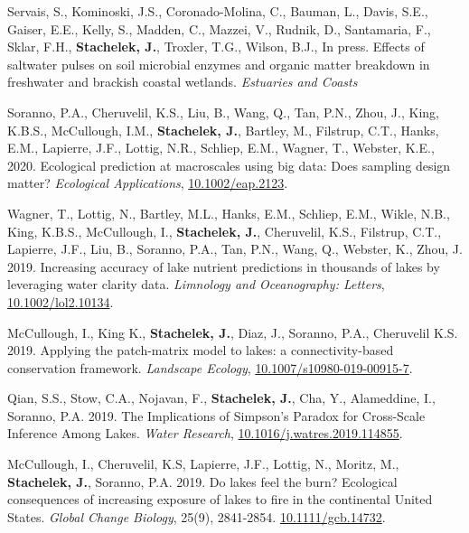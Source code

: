 \documentclass[11pt]{article}
\makeatletter
\newlength{\bibhang}
\newlength{\bibsep}
 {\@listi \global\bibsep\itemsep \global\advance\bibsep by\parsep}
\newenvironment{bibenum*}
  {\renewcommand\labelenumi{[\theenumi]}%
   \etaremune[
     topsep=0pt,
     itemsep=\bibsep,
     parsep=0pt,partopsep=0pt,
     itemindent=-\bibhang,
     leftmargin={\bibhang+\widthof{[999]}}]}
  {\endetaremune}
\makeatother
\begin{document}
\begin{bibenum*}

\item Servais, S., Kominoski, J.S., Coronado-Molina, C., Bauman, L., Davis, S.E., Gaiser, E.E., Kelly, S., Madden, C., Mazzei, V., Rudnik, D., Santamaria, F., Sklar, F.H., \textbf{Stachelek, J.}, Troxler, T.G., Wilson, B.J., In press. Effects of saltwater pulses on soil microbial enzymes and organic matter breakdown in freshwater and brackish coastal wetlands. \emph{Estuaries and Coasts}

\item Soranno, P.A., Cheruvelil, K.S., Liu, B., Wang, Q., Tan, P.N., Zhou, J., King, K.B.S., McCullough, I.M., \textbf{Stachelek, J.}, Bartley, M., Filstrup, C.T., Hanks, E.M., Lapierre, J.F., Lottig, N.R., Schliep, E.M., Wagner, T., Webster, K.E., 2020. Ecological prediction at macroscales using big data: Does sampling design matter? \emph{Ecological Applications}, \href{https://doi.org/10.1002/eap.2123}{10.1002/eap.2123}.

\item Wagner, T., Lottig, N., Bartley, M.L., Hanks, E.M., Schliep, E.M., Wikle, N.B., King, K.B.S., McCullough, I., \textbf{Stachelek, J.}, Cheruvelil, K.S., Filstrup, C.T., Lapierre, J.F., Liu, B., Soranno, P.A., Tan, P.N., Wang, Q., Webster, K.,  Zhou, J. 2019. Increasing accuracy of lake nutrient predictions in thousands of lakes by leveraging water clarity data. \emph{Limnology and Oceanography: Letters}, \href{https://doi.org/10.1002/lol2.10134}{10.1002/lol2.10134}. 

\item McCullough, I., King K., \textbf{Stachelek, J.}, Diaz, J., Soranno, P.A., Cheruvelil K.S. 2019. Applying the patch-matrix model to lakes: a connectivity-based conservation framework. \emph{Landscape Ecology}, \href{https://doi.org/10.1007/s10980-019-00915-7}{10.1007/s10980-019-00915-7}.

\item Qian, S.S., Stow, C.A., Nojavan, F., \textbf{Stachelek, J.}, Cha, Y., Alameddine, I., Soranno, P.A. 2019. The Implications of Simpson's Paradox for Cross-Scale Inference Among Lakes. \emph{Water Research}, \href{https://doi.org/10.1016/j.watres.2019.114855}{10.1016/j.watres.2019.114855}.

\item McCullough, I., Cheruvelil, K.S, Lapierre, J.F., Lottig, N., Moritz, M., \textbf{Stachelek, J.}, Soranno, P.A. 2019. Do lakes feel the burn? Ecological consequences of increasing exposure of lakes to fire in the continental United States. \emph{Global Change Biology}, 25(9), 2841-2854. \href{https://doi.org/10.1111/gcb.14732}{10.1111/gcb.14732}.


\end{bibenum*}
\end{document}
